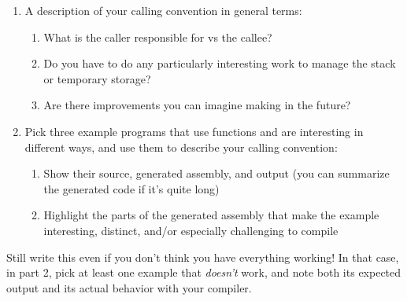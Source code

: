 \documentclass[10pt, oneside]{article}
\begin{document}
\begin{enumerate}
  \item A description of your calling convention in general terms:
    \begin{enumerate}
      \item What is the caller responsible for vs the callee?
      \item Do you have to do any particularly interesting work to manage the
      stack or temporary storage?
      \item Are there improvements you can imagine making in the future?
    \end{enumerate}
  \item Pick three example programs that use functions and are interesting in
  different ways, and use them to describe your calling convention:
  \begin{enumerate}
    \item Show their source, generated assembly, and output (you can
    summarize the generated code if it's quite long)
    \item Highlight the parts of the generated assembly that make the example
    interesting, distinct, and/or especially challenging to compile
  \end{enumerate}
\end{enumerate}

Still write this even if you don't think you have everything working! In that
case, in part 2, pick at least one example that {\it doesn't} work, and note
both its expected output and its actual behavior with your compiler.
\end{document}

